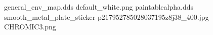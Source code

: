 general_env_map.dds
default_white.png
paintablealpha.dds
smooth_metal_plate_sticker-p217952785028037195z8j38_400.jpg
CHROMIC3.png
